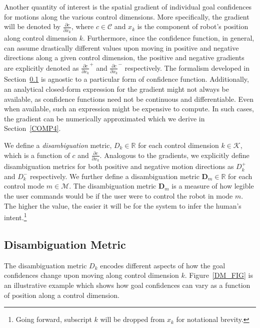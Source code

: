 \documentclass[conference]{IEEEtran}
\begin{document}
Another quantity of interest is the spatial gradient of individual goal confidences for motions along the various control dimensions. More specifically, the gradient will be denoted by $\frac{\partial c}{\partial x_k}$, where $c \in \mathcal{C}$ and $x_k$ is the component of robot's position along control dimension $k$. Furthermore, since the confidence function, in general, can assume drastically different values upon moving in positive and negative directions along a  given control dimension, the positive and negative gradients are explicitly denoted as $\frac{\partial c}{\partial x_k}^{+}$ and $\frac{\partial c}{\partial x_k}^{-}$ respectively. The formalism developed in Section~\ref{DM} is agnostic to a particular form of confidence function. Additionally, an analytical closed-form expression for the gradient might not always be available, as confidence functions need not be continuous and differentiable. Even when available, such an expression might be expensive to compute. In such cases, the gradient can be numerically approximated which we derive in Section~\ref{COMP4}.

We define a \textit{disambiguation} metric, $D_{k}\in \mathbb{R}$ for each control dimension $k \in \mathcal{K}$, which is a function of $c$ and $\frac{\partial c}{\partial x_k}$. Analogous to the gradients, we explicitly define disambiguation metrics for both positive and negative motion directions as $D_{k}^{+}$ and $D_{k}^{-}$ respectively.
We further define a disambiguation metric $\boldsymbol{D}_m \in \mathbb{R}$ for each control mode $m \in \mathcal{M}$.
The disambiguation metric $\boldsymbol{D}_m$ is a measure of how legible the user commands would be if the user were to control the robot in mode $m$. The higher the value, the easier it will be for the system to infer the human's intent.\footnote{Going forward, subscript $k$ will be dropped from $x_k$ for notational brevity.} 

\subsection{Disambiguation Metric}\label{DM}

The disambiguation metric $D_{k}$ encodes different aspects of how the goal confidences change upon moving along control dimension $k$. Figure~\ref{DM_FIG} is an illustrative example which shows how goal confidences can vary as a function of position along a control dimension. 
\end{document}
